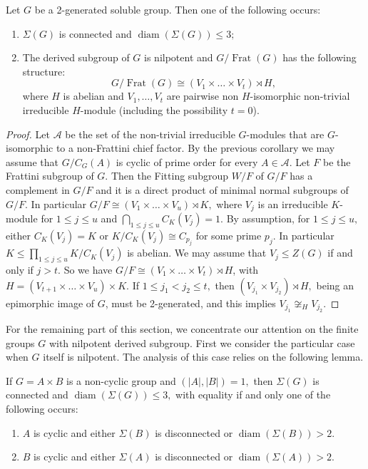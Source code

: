 \documentclass{amsart}
\DeclareMathOperator{\frat}{Frat}
\DeclareMathOperator{\diam}{diam}
\numberwithin{equation}{section}
\begin{document}
\begin{lemma}\label{pochi} Let $G$ be a 2-generated soluble group. Then one of the following occurs:
	\begin{enumerate}
		\item $\Sigma(G)$ is connected and $\diam(\Sigma(G))\leq 3;$
		\item The derived subgroup of $G$ is nilpotent and 
		$G/\frat(G)$ has the following structure:
		$$G/\frat(G)\cong (V_1\times \dots \times V_t)\rtimes H,$$
		where $H$ is abelian and $V_1,\dots,V_t$
		are pairwise non $H$-isomorphic non-trivial irreducible $H$-module (including the possibility $t=0$).
	\end{enumerate}
\end{lemma}
\begin{proof}
Let $\mathcal A$ be the set of the non-trivial irreducible $G$-modules that are $G$-iso\-morphic to a non-Frattini chief factor. By the previous corollary we may assume that $G/C_G(A)$ is cyclic of prime order for every $A\in \mathcal A.$ Let $F$ be the Frattini subgroup of $G$. Then the Fitting subgroup $W/F$ of $G/F$ has a complement in $G/F$ and it is a direct product of minimal normal subgroups of $G/F.$ In particular $G/F \cong (V_1\times \dots \times V_u) \rtimes K,$  where $V_j$ is an irreducible $K$-module for $1\leq j \leq u$ and $\bigcap_{1\leq j \leq u}C_K(V_j)=1.$ By assumption, for $1\leq j\leq u,$ either $C_K(V_j)=K$ or $K/C_K(V_j)\cong C_{p_j}$ for some prime $p_j.$  In particular
$K \leq \prod_{1\leq j\leq u}K/C_K(V_j)$ is abelian.
We may assume that $V_j \leq Z(G)$ if and only if $j>t.$ So we have
$G/F\cong (V_1\times \dots \times V_t) \rtimes H$, with $H=(V_{t+1}\times \dots \times V_u)\times K.$ If $1\leq j_1 < j_2\leq t,$ then $(V_{j_1}\times V_{j_2})\rtimes H,$ being an epimorphic image of $G$, must be 2-generated, and this implies
$V_{j_1}\not\cong_H V_{j_2}.$%
\end{proof}

For the remaining part of this section, we concentrate our attention on the finite groups $G$ with nilpotent derived subgroup.
First we consider the particular case when $G$ itself is nilpotent. The analysis of this case relies on the following lemma.
\begin{lemma}\label{prod}
	If $G=A \times B$ is a non-cyclic group and $(|A|,|B|)=1,$ then
	$\Sigma(G)$ is connected and $\diam(\Sigma(G))\leq 3,$
	with equality if and only one of the following occurs:
	\begin{enumerate}
		\item $A$ is cyclic and either $\Sigma(B)$ is disconnected or
		 $\diam(\Sigma(B))>2.$
		\item $B$ is cyclic and either $\Sigma(A) $ is disconnected or $\diam(\Sigma(A))>2.$
	\end{enumerate}
	
\end{lemma}
\end{document}
